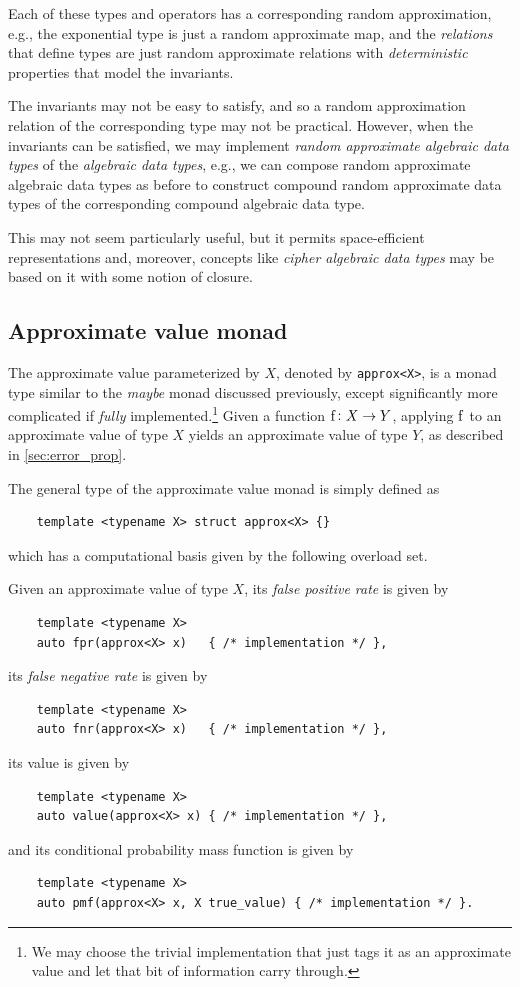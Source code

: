 \documentclass[ ../main.tex]{subfiles}
\begin{document}
Each of these types and operators has a corresponding random approximation, e.g., the exponential type is just a random approximate map, and the \emph{relations} that define types are just random approximate relations with \emph{deterministic} properties that model the invariants.

The invariants may not be easy to satisfy, and so a random approximation relation of the corresponding type may not be practical.
However, when the invariants can be satisfied, we may implement \emph{random approximate algebraic data types} of the \emph{algebraic data types}, e.g., we can compose random approximate algebraic data types as before to construct compound random approximate data types of the corresponding compound algebraic data type.

This may not seem particularly useful, but it permits space-efficient representations and, moreover, concepts like \emph{cipher algebraic data types} may be based on it with some notion of closure.

\subsection{Approximate value monad}

The approximate value parameterized by $X$, denoted by \texttt{approx<X>}, is a monad type similar to the \emph{maybe} monad discussed previously, except significantly more complicated if \emph{fully} implemented.\footnote{We may choose the trivial implementation that just tags it as an approximate value and let that bit of information carry through.}
Given a function $\Fun{f} \colon X \to Y$, applying $\Fun{f}$ to an approximate value of type $X$ yields an approximate value of type $Y$, as described in \cref{sec:error_prop}.

The general type of the approximate value monad is simply defined as
\begin{verbatim}
	template <typename X> struct approx<X> {}
\end{verbatim}
which has a computational basis given by the following overload set.

Given an approximate value of type $X$, its \emph{false positive rate} is given by
\begin{verbatim}
	template <typename X>
	auto fpr(approx<X> x)   { /* implementation */ },
\end{verbatim}
its \emph{false negative rate} is given by
\begin{verbatim}
	template <typename X>
	auto fnr(approx<X> x)   { /* implementation */ },
\end{verbatim}
its value is given by
\begin{verbatim}
	template <typename X>
	auto value(approx<X> x) { /* implementation */ },
\end{verbatim}
and its conditional probability mass function is given by
\begin{verbatim}
	template <typename X>
	auto pmf(approx<X> x, X true_value) { /* implementation */ }.
\end{verbatim}
\end{document}
